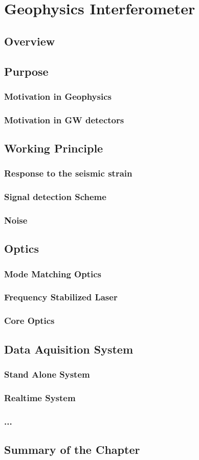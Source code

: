 \chapter{Geophysics Interferometer}
\section{Overview}
\section{Purpose}
\subsection{Motivation in Geophysics}
\subsection{Motivation in GW detectors}
\section{Working Principle}
\subsection{Response to the seismic strain}
\subsection{Signal detection Scheme}
\subsection{Noise}
\section{Optics}
\subsection{Mode Matching Optics}
\subsection{Frequency Stabilized Laser}
\subsection{Core Optics}
\section{Data Aquisition System}
\subsection{Stand Alone System}
\subsection{Realtime System}
\subsection{...}
\section{Summary of the Chapter}

